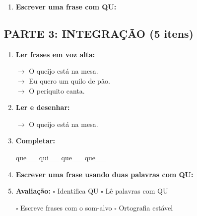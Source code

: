 \begin{exercicio}
\begin{enumerate}[resume]
  \item \textbf{Escrever uma frase com QU:}
  \begin{center}
  \underline{\hspace{12cm}}
  \end{center}

\end{enumerate}

\subsection*{PARTE 3: INTEGRAÇÃO (5 itens)}

\begin{enumerate}[resume]

  \item \textbf{Ler frases em voz alta:}
  \begin{center}
  $\rightarrow$ O queijo está na mesa.\\
  $\rightarrow$ Eu quero um quilo de pão.\\
  $\rightarrow$ O periquito canta.\\
  \end{center}

  \item \textbf{Ler e desenhar:}
  \begin{center}
  $\rightarrow$ O queijo está na mesa.
  \end{center}
  \begin{center}
  \end{center}

  \item \textbf{Completar:}
  \begin{center}
  que\underline{~~~} \quad qui\underline{~~~} \quad que\underline{~~~} \quad que\underline{~~~}
  \end{center}

  \item \textbf{Escrever uma frase usando duas palavras com QU:}
  \begin{center}
  \underline{\hspace{12cm}}
  \end{center}

  \item \textbf{Avaliação:} $\square$ Identifica QU \quad $\square$ Lê palavras com QU
  \begin{center}
  $\square$ Escreve frases com o som-alvo \quad $\square$ Ortografia estável
  \end{center}


\end{enumerate}
\end{exercicio}
